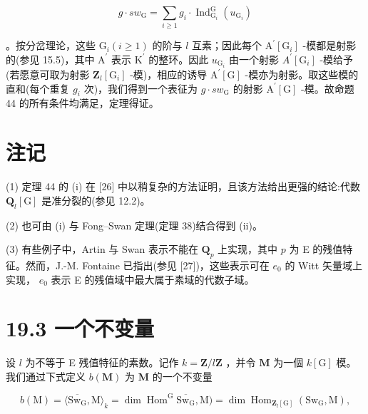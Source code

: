 \documentclass[10pt]{article}
\begin{document}
\[
g \cdot  s{w}_{\mathrm{G}} = \mathop{\sum }\limits_{{i \geq  1}}{g}_{i} \cdot  {\operatorname{Ind}}_{{\mathrm{G}}_{i}}^{\mathrm{G}}\left( {u}_{{\mathrm{G}}_{i}}\right)
\]

。按分岔理论，这些 \({\mathrm{G}}_{i}\left( {i \geq  1}\right)\) 的阶与 \(l\) 互素；因此每个 \({\mathrm{A}}^{\prime }\left\lbrack  {\mathrm{G}}_{i}\right\rbrack\) -模都是射影的(参见 15.5)，其中 \({\mathrm{A}}^{\prime }\) 表示 \({\mathrm{K}}^{\prime }\) 的整环。因此 \({u}_{{\mathrm{G}}_{i}}\) 由一个射影 \({A}^{\prime }\left\lbrack  {\mathrm{G}}_{i}\right\rbrack\) -模给予(若愿意可取为射影 \({\mathbf{Z}}_{l}\left\lbrack  {\mathrm{G}}_{i}\right\rbrack\) -模)，相应的诱导 \({\mathrm{A}}^{\prime }\left\lbrack  \mathrm{G}\right\rbrack\) -模亦为射影。取这些模的直和(每个重复 \({g}_{i}\) 次)，我们得到一个表征为 \(g \cdot  s{w}_{\mathrm{G}}\) 的射影 \({\mathrm{A}}^{\prime }\left\lbrack  \mathrm{G}\right\rbrack\) -模。故命题 44 的所有条件均满足，定理得证。

\section*{注记}

(1) 定理 44 的 (i) 在 [26] 中以稍复杂的方法证明，且该方法给出更强的结论:代数 \({\mathbf{Q}}_{l}\left\lbrack  \mathrm{G}\right\rbrack\) 是准分裂的(参见 12.2)。

(2) 也可由 (i) 与 Fong–Swan 定理(定理 38)结合得到 (ii)。

(3) 有些例子中，Artin 与 Swan 表示不能在 \({\mathbf{Q}}_{p}\) 上实现，其中 \(p\) 为 E 的残值特征。然而，J.-M. Fontaine 已指出(参见 [27])，这些表示可在 \({e}_{0}\) 的 Witt 矢量域上实现， \({e}_{0}\) 表示 E 的残值域中最大属于素域的代数子域。

\section*{19.3 一个不变量}

设 \(l\) 为不等于 E 残值特征的素数。记作 \(k = \mathbf{Z}/l\mathbf{Z}\) ，并令 \(\mathbf{M}\) 为一個 \(k\left\lbrack  \mathrm{G}\right\rbrack\) 模。我们通过下式定义 \(b\left( \mathbf{M}\right)\) 为 \(\mathbf{M}\) 的一个不变量

\[
b\left( \mathrm{M}\right)  = \langle \overline{{\mathrm{{Sw}}}_{\mathrm{G}}},\mathrm{M}{\rangle }_{k} = \dim {\operatorname{Hom}}^{\mathrm{G}}\overline{{\mathrm{{Sw}}}_{\mathrm{G}}},\mathrm{M}) = \dim {\operatorname{Hom}}_{{\mathbf{Z}}_{l}\left\lbrack  \mathrm{G}\right\rbrack  }\left( {{\mathrm{{Sw}}}_{\mathrm{G}},\mathrm{M}}\right) ,
\]
\end{document}
